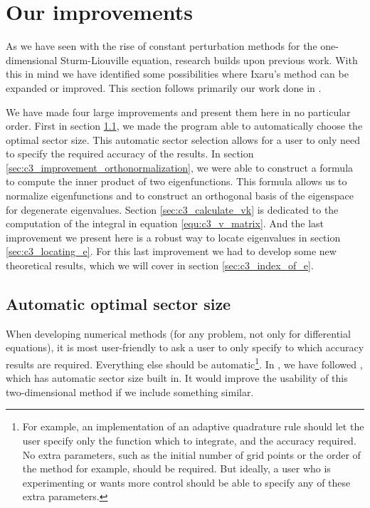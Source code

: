 \section{Our improvements}\label{sec:c3_improvements}

As we have seen with the rise of constant perturbation methods for the one-dimensional Sturm-Liouville equation, research builds upon previous work. With this in mind we have identified some possibilities where Ixaru's method can be expanded or improved. This section follows primarily our work done in \cite{baeyens_fast_2020}.

We have made four large improvements and present them here in no particular order. First in section \ref{sec:c3_improvement_automatic_sectors}, we made the program able to automatically choose the optimal sector size. This automatic sector selection allows for a user to only need to specify the required accuracy of the results. In section \ref{sec:c3_improvement_orthonormalization}, we were able to construct a formula to compute the inner product of two eigenfunctions. This formula allows us to normalize eigenfunctions and to construct an orthogonal basis of the eigenspace for degenerate eigenvalues. Section \ref{sec:c3_calculate_vk} is dedicated to the computation of the integral in equation \eqref{equ:c3_v_matrix}. And the last improvement we present here is a robust way to locate eigenvalues in section \ref{sec:c3_locating_e}. For this last improvement we had to develop some new theoretical results, which we will cover in section \ref{sec:c3_index_of_e}.


\subsection{Automatic optimal sector size}\label{sec:c3_improvement_automatic_sectors}

When developing numerical methods (for any problem, not only for differential equations), it is most user-friendly to ask a user to only specify to which accuracy results are required. Everything else should be automatic\footnote{For example, an implementation of an adaptive quadrature rule should let the user specify only the function which to integrate, and the accuracy required. No extra parameters, such as the initial number of grid points or the order of the method for example, should be required. But ideally, a user who is experimenting or wants more control should be able to specify any of these extra parameters.}. In , we have followed , which has automatic sector size built in. It would improve the usability of this two-dimensional method if we include something similar.

